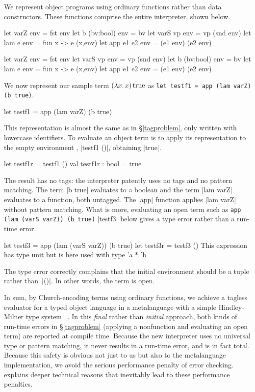 We represent object programs using ordinary functions rather than
data constructors.  These functions comprise the entire interpreter, shown
below.
\ifshort
\begin{code3}
let varZ env    = fst env         let b (bv:bool) env = bv
let varS vp env = vp (snd env)    let lam e env   = fun x -> e (x,env)
let app e1 e2 env   = (e1 env) (e2 env)
\end{code3}
\else
\begin{code}
let varZ env        = fst env
let varS vp env     = vp (snd env)
let b (bv:bool) env = bv
let lam e env       = fun x -> e (x,env)
let app e1 e2 env   = (e1 env) (e2 env)
\end{code}
\fi
We now represent our sample term $(\mathopen{\lambda\mathord{x}.\,}x)\mathinner{\mathrm{true}}$ as
\ifshort
\texttt{let testf1 = app (lam varZ) (b true)}.
\else
\begin{code}
let testf1 = app (lam varZ) (b true)
\end{code}
\fi
This representation is almost the same as in \S\ref{tagproblem}, only
written with lowercase identifiers. To evaluate an object term is to
apply its representation to the empty environment\ifshort
, |testf1 ()|, obtaining |true|\fi.
\ifshort\else
\begin{code}
let testf1r = testf1 ()
val testf1r : bool = true
\end{code}
\fi
The result has no tags: the interpreter patently uses no tags and no
pattern matching. The term |b true| evaluates to a boolean and the term
|lam varZ| evaluates to a function, both untagged. The |app| function
applies |lam varZ| without pattern matching. What is more, evaluating an
open term such as
\ifshort
\texttt{app (lam (varS varZ)) (b true)}
\else
|testf3| below
\fi
gives a type error rather than a run-time error.
\ifshort\else
\begin{code}
let testf3 = app (lam (varS varZ)) (b true)
let testf3r = testf3 ()
This expression has type unit but is here used with type 'a * 'b
\end{code}
\fi
The type error correctly complains
that the initial environment should be a tuple rather than~|()|.
In other words, the term is open.

In sum, by Church\hyp encoding terms using ordinary functions, we
achieve a tagless evaluator for a typed object language in a
metalanguage with a simple 
\ifshort
Hindley-Milner \fi
type system\ifshort\else\ \citep{hindley-principal,milner-theory}\fi
.  In this \emph{final} rather
than \emph{initial} approach, both kinds of run-time errors in
\S\ref{tagproblem} (applying a nonfunction and evaluating an open
term) are reported at compile time. Because the new interpreter
uses no universal type or pattern matching, it never results in a
run-time error, and is in fact total.  Because this safety is obvious
not just to us but also to the metalanguage implementation, we avoid
the serious performance penalty \citep{WalidICFP02} of error checking.
 explains deeper technical reasons that
inevitably lead to these performance penalties.

